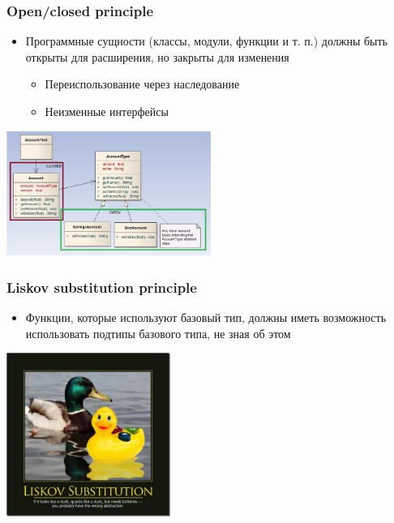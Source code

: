 \documentclass[xetex,mathserif,serif]{beamer}
\begin{document}
	\begin{frame}
		\frametitle{Open/closed principle}
		\begin{itemize}
			\item Программные сущности (классы, модули, функции и т. п.) должны быть открыты для расширения, но закрыты для изменения
			\begin{itemize}
				\item Переиспользование через наследование
				\item Неизменные интерфейсы
			\end{itemize}
		\end{itemize}
		\begin{flushright}
			\includegraphics[width=0.5\textwidth]{openClosedPrinciple.png}
		\end{flushright}
	\end{frame}

	\begin{frame}
		\frametitle{Liskov substitution principle}
		\begin{itemize}
			\item Функции, которые используют базовый тип, должны иметь возможность использовать подтипы базового типа, не зная об этом
		\end{itemize}
		\begin{flushright}
			\includegraphics[width=0.4\textwidth]{liskovSubstitutionPrinciple.png}
		\end{flushright}
	\end{frame}
\end{document}
